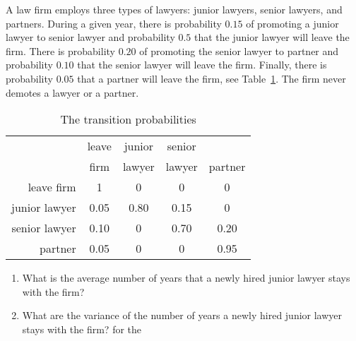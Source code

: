 \documentclass[12pt]{article}
\begin{document}
\renewcommand{\theexerciseseries}{}
\renewcommand{\theexercise}{\arabic{exercise}}

\begin{exercise}
    A law firm employs three types of lawyers:  junior lawyers, senior
    lawyers, and partners.  During a given year, there is probability \(
    0.15 \) of promoting a junior lawyer to senior lawyer and
    probability \( 0.5 \) that the junior lawyer will leave the firm.
    There is probability \( 0.20 \) of promoting the senior lawyer to
    partner and probability \( 0.10 \) that the senior lawyer will leave
    the firm.  Finally, there is probability \( 0.05 \) that a partner
    will leave the firm, see
    Table~\ref{tab:newwaitingtimeabsorption:lawyers}.  
    The firm never demotes a lawyer or a partner.
  
    \begin{table}[htbp]
        \caption[]{The transition probabilities }
        \vspace{4mm}
        \begin{tabular}[tb]
            {r|cccc} & leave & junior & senior & \\
            & firm & lawyer & lawyer & partner \\
            \hline
            leave firm & 1 & 0 & 0 & 0 \\
            junior lawyer & 0.05 & 0.80 & 0.15 & 0 \\
            senior lawyer & 0.10 & 0 & 0.70 & 0.20 \\
            partner & 0.05 & 0 & 0 & 0.95
        \end{tabular}
        \label{tab:newwaitingtimeabsorption:lawyers}
    \end{table}

    \begin{enumerate}
    \item   What is the average number of years that a newly hired junior lawyer
    stays with the firm?
  \item What are the variance of the number of years a newly hired junior lawyer
    stays with the firm?
    for the  

    \end{enumerate}
  \end{exercise}
\end{document}
